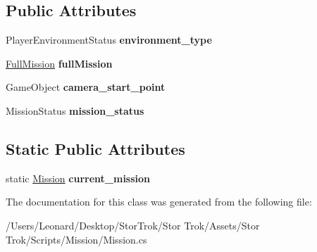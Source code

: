 \subsection*{Public Attributes}
\begin{DoxyCompactItemize}
\item 
\mbox{\label{class_mission_a3272ee986e1263d7e84667e4da3efef6}} 
Player\+Environment\+Status {\bfseries environment\+\_\+type}
\item 
\mbox{\label{class_mission_a8af9bf41bf75c2e6c2371ae648ec8508}} 
\hyperlink{class_full_mission}{Full\+Mission} {\bfseries full\+Mission}
\item 
\mbox{\label{class_mission_a7cfb32ad3e950150fc5cd542111fb1cf}} 
Game\+Object {\bfseries camera\+\_\+start\+\_\+point}
\item 
\mbox{\label{class_mission_acd86a0869fb24b9535104f7eb21e7332}} 
Mission\+Status {\bfseries mission\+\_\+status}
\end{DoxyCompactItemize}
\subsection*{Static Public Attributes}
\begin{DoxyCompactItemize}
\item 
\mbox{\label{class_mission_aa537dedc4dcd1d7ae6662ecf614bbea1}} 
static \hyperlink{class_mission}{Mission} {\bfseries current\+\_\+mission}
\end{DoxyCompactItemize}


The documentation for this class was generated from the following file\+:\begin{DoxyCompactItemize}
\item 
/\+Users/\+Leonard/\+Desktop/\+Stor\+Trok/\+Stor Trok/\+Assets/\+Stor Trok/\+Scripts/\+Mission/Mission.\+cs\end{DoxyCompactItemize}

